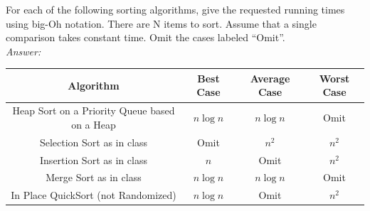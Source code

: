 \documentclass[a4paper]{article}
\newcommand{\ans}{\textit{Answer: }}
\newenvironment{question}[2][Question]{\begin{trivlist}
\item[\hskip \labelsep {\bfseries #1}\hskip \labelsep {\bfseries #2.}]}{\end{trivlist}}
\begin{document}
\begin{question}{15}
For each of the following sorting algorithms, give the requested running times using big-Oh
notation. There are N items to sort. Assume that a single comparison takes constant time.
Omit the cases labeled “Omit”. \\

\ans \\
\begin{tabular}{|c|c|c|c|}
\hline
\textbf{Algorithm}                            & \textbf{Best Case} & \textbf{Average Case} & \textbf{Worst Case} \\ \hline
Heap Sort on a Priority Queue based on a Heap & $n \log n$         & $n \log n$            & Omit                \\ \hline
Selection Sort as in class                    & Omit               & $n^2$                 & $n^2$               \\ \hline
Insertion Sort as in class                    & $n$                & Omit                  & $n^2$               \\ \hline
Merge Sort as in class                        & $n \log n$         & $n \log n$            & Omit                \\ \hline
In Place QuickSort (not Randomized)           & $n \log n$         & Omit                  & $n^2$               \\ \hline
\end{tabular}
\end{question}
\end{document}
